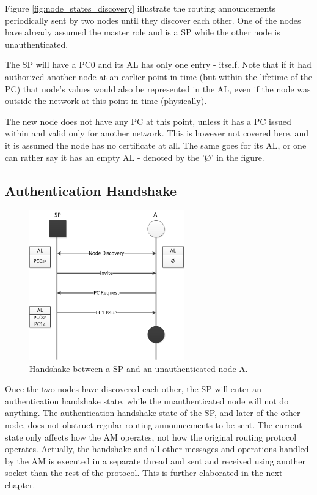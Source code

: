 Figure \ref{fig:node_states_discovery} illustrate the routing announcements
periodically sent by two nodes until they discover each other. One of the nodes
have already assumed the master role and is a \ac{SP} while the other node is
unauthenticated.

The \ac{SP} will have a \ac{PC0} and its \ac{AL} has only one entry - itself.
Note that if it had authorized another node at an earlier point in time (but
within the lifetime of the \ac{PC}) that node's values would also be
represented in the \ac{AL}, even if the node was outside the network at this
point in time (physically).

The new node does not have any \ac{PC} at this point, unless it has a \ac{PC}
issued within and valid only for another network. This is however not covered
here, and it is assumed the node has no certificate at all. The same goes for
its \ac{AL}, or one can rather say it has an empty \ac{AL} - denoted by the
'\O' in the figure.

\subsection{Authentication Handshake}

\begin{figure}[h]
	\centering
  	\includegraphics[width=0.6\textwidth]{images/node_states_handshake.png}
  	\caption{Handshake between a \acf{SP} and an unauthenticated node A.}
	\label{fig:node_states_handshake}
\end{figure}

Once the two nodes have discovered each other, the \ac{SP} will enter an
authentication handshake state, while the unauthenticated node will not do
anything. The authentication handshake state of the \ac{SP}, and later of the
other node, does not obstruct regular routing announcements to be sent. The
current state only affects how the \ac{AM} operates, not how the original
routing protocol operates. Actually, the handshake and all other messages and
operations handled by the \ac{AM} is executed in a separate thread and sent
and received using another socket than the rest of the protocol. This is
further elaborated in the next chapter.

